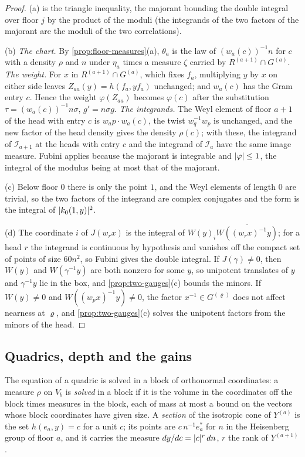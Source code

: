 \begin{proof}
(a) is the triangle inequality, the majorant bounding the double integral over floor $j$ by the product of the moduli (the integrands of the two factors of the majorant are the moduli of the two correlations).

(b) \emph{The chart.} By \cref{prop:floor-measures}(a), $\theta_a$ is the law of $(w_a(c))^{-1}n$ for $c$ with a density $\rho$ and $n$ under $\eta_a$ times a measure $\zeta$ carried by $R^{(a+1)}\cap G^{(a)}$. \emph{The weight.} For $x$ in
$R^{(a+1)}\cap G^{(a)}$, which fixes $f_a$, multiplying $y$ by $x$ on either side leaves $Z_{aa}(y)=h(f_a,yf_a)$ unchanged; and $w_a(c)$ has the Gram entry $c$. Hence the weight $\varphi(Z_{aa})$ becomes $\varphi(c)$ after the substitution
$\tau=(w_a(c))^{-1}n\sigma$, $g'=n\sigma g$. \emph{The integrands.} The Weyl element of floor $a+1$ of the head with entry $c$ is $w_ap\cdot w_a(c)$, the twist $w_q^{-1}w_p$ is unchanged, and the new factor of the head density gives the density
$\rho(c)$; with these, the integrand of $\mathcal I_{a+1}$ at the heads with entry $c$ and the integrand of $\mathcal I_a$ have the same image measure. Fubini applies because the majorant is integrable and $\lvert \varphi\rvert\le1$, the integral
of the modulus being at most that of the majorant.

(c) Below floor $0$ there is only the point $1$, and the Weyl elements of length $0$ are trivial, so the two factors of the integrand are complex conjugates and the form is the integral of $\lvert k_0(1,y)\rvert^2$.

(d) The coordinate $i$ of $J(w_rx)$ is the integral of $W(y)_i\overline{W((w_rx)^{-1}y)}$; for a head $r$ the integrand is continuous by hypothesis and vanishes off the compact set of points of size $60n^2$, so Fubini gives the double
integral. If $J(\gamma)\ne0$, then $W(y)$ and $W(\gamma^{-1}y)$ are both nonzero for some $y$, so unipotent translates of $y$ and $\gamma^{-1}y$ lie in the box, and \cref{prop:two-gauges}(c) bounds the minors. If $W(y)\ne0$ and
$W((w_px)^{-1}y)\ne0$, the factor $x^{-1}\in G^{(\varrho)}$ does not affect nearness at $\varrho$, and \cref{prop:two-gauges}(c) solves the unipotent factors from the minors of the head.
\end{proof}

\subsection{Quadrics, depth and the gains}\label{ss:frame-tools}
The equation of a quadric is solved in a block of orthonormal coordinates: a measure $\rho$ on $V_b$ is \emph{solved} in a block if it is the volume in the coordinates off the block times measures in the block,
each of mass at most a bound on the vectors whose block coordinates have given size. A \emph{section} of the isotropic cone of $Y^{(a)}$ is the set $h(e_a,y)=c$ for a unit $c$; its points are $c\,n^{-1}e^*_a$ for $n$ in the Heisenberg
group of floor $a$, and it carries the measure $dy/dc=\lvert c\rvert^r\,dn$, $r$ the rank of $Y^{(a+1)}$.

